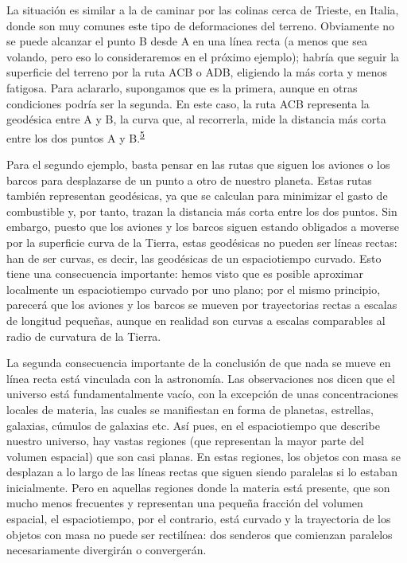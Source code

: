 La situación es similar a la de caminar por las colinas cerca de Trieste, en Italia, donde son
muy comunes este tipo de deformaciones del terreno. Obviamente no se puede alcanzar el punto B
desde A en una línea recta (a menos que sea volando, pero eso lo consideraremos en el próximo
ejemplo); habría que seguir la superficie del terreno por la ruta ACB o ADB, eligiendo la más
corta y menos fatigosa. Para aclararlo, supongamos que es la primera, aunque en otras
condiciones podría ser la segunda. En este caso, la ruta ACB representa la geodésica entre A y
B, la curva que, al recorrerla, mide la distancia más corta entre los dos puntos A y
B.\textsuperscript{\hyperlink{note:03-05}{5}}

Para el segundo ejemplo, basta pensar en las rutas que siguen los aviones o los barcos para
desplazarse de un punto a otro de nuestro planeta. Estas rutas también representan geodésicas,
ya que se calculan para minimizar el gasto de combustible y, por tanto, trazan la distancia más
corta entre los dos puntos. Sin embargo, puesto que los aviones y los barcos siguen estando
obligados a moverse por la superficie curva de la Tierra, estas geodésicas no pueden ser líneas
rectas: han de ser curvas, es decir, las geodésicas de un espaciotiempo curvado. Esto tiene una
consecuencia importante: hemos visto que es posible aproximar localmente un espaciotiempo
curvado por uno plano; por el mismo principio, parecerá que los aviones y los barcos se mueven
por trayectorias rectas a escalas de longitud pequeñas, aunque en realidad son curvas a escalas
comparables al radio de curvatura de la Tierra.

La segunda consecuencia importante de la conclusión de que nada se mueve en línea recta está
vinculada con la astronomía. Las observaciones nos dicen que el universo está fundamentalmente
vacío, con la excepción de unas concentraciones locales de materia, las cuales se manifiestan
en forma de planetas, estrellas, galaxias, cúmulos de galaxias etc. Así pues, en el
espaciotiempo que describe nuestro universo, hay vastas regiones (que representan la mayor
parte del volumen espacial) que son casi planas. En estas regiones, los objetos con masa se
desplazan a lo largo de las líneas rectas que siguen siendo paralelas si lo estaban
inicialmente. Pero en aquellas regiones donde la materia está presente, que son mucho menos
frecuentes y representan una pequeña fracción del volumen espacial, el espaciotiempo, por el
contrario, está curvado y la trayectoria de los objetos con masa no puede ser rectilínea: dos
senderos que comienzan paralelos necesariamente divergirán o convergerán.

